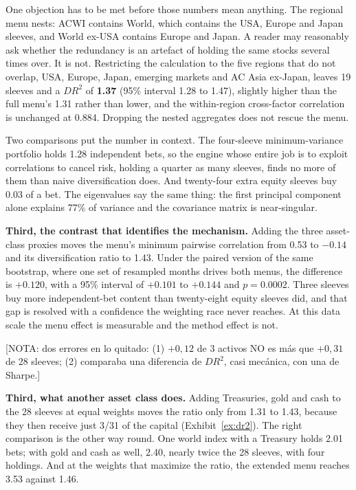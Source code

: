 \documentclass[12pt,letterpaper]{article}
\newcommand{\nota}[1]{{\color{notac}\sffamily\small [NOTA: #1]}}
\newenvironment{quitado}{\par\color{quitarc}}{\par}
\newenvironment{nuevotexto}{\par\color{nuevoc}}{\par}
\newcommand{\head}[1]{\noindent\textbf{#1}\hspace{0.5em}\ignorespaces}
\begin{document}
One objection has to be met before those numbers mean anything. The regional menu nests:
ACWI contains World, which contains the USA, Europe and Japan sleeves, and World ex-USA
contains Europe and Japan. A reader may reasonably ask whether the redundancy is an artefact of
holding the same stocks several times over. It is not. Restricting the calculation to the five
regions that do not overlap, USA, Europe, Japan, emerging markets and AC Asia ex-Japan, leaves
19 sleeves and a $DR^{2}$ of \textbf{1.37} (95\% interval 1.28 to 1.47), slightly higher than
the full menu's 1.31 rather than lower, and the within-region cross-factor correlation is
unchanged at 0.884. Dropping the nested aggregates does not rescue the menu.

Two comparisons put the number in context. The four-sleeve minimum-variance portfolio holds
1.28 independent bets, so the engine whose entire job is to exploit correlations to
cancel risk, holding a quarter as many sleeves, finds no more of them than naive diversification
does. And twenty-four extra equity sleeves buy 0.03 of a bet. The eigenvalues say the same thing: the first principal component alone explains
77\% of variance and the covariance matrix is near-singular.

\begin{quitado}
\head{Third, the contrast that identifies the mechanism.} Adding the three
asset-class proxies moves the menu's minimum pairwise correlation from 0.53 to
$-0.14$ and its diversification ratio to 1.43. Under the paired version of the
same bootstrap, where one set of resampled months drives both menus, the
difference is $+0.120$, with a 95\% interval of $+0.101$ to $+0.144$ and $p = 0.0002$. Three sleeves buy more independent-bet content than twenty-eight
equity sleeves did, and that gap is resolved with a confidence the weighting race
never reaches. At this data scale the menu effect is measurable and the method effect is not.
\end{quitado}
\nota{dos errores en lo quitado: (1) $+0{,}12$ de 3 activos NO es m\'as que $+0{,}31$ de 28 sleeves; (2) comparaba una diferencia de $DR^2$, casi mec\'anica, con una de Sharpe.}
\begin{nuevotexto}
\head{Third, what another asset class does.} Adding Treasuries, gold and cash to the 28 sleeves at
equal weights moves the ratio only from 1.31 to 1.43, because they then receive just 3/31 of the
capital (Exhibit~\ref{ex:dr2}). The right comparison is the other way round. One world index with a
Treasury holds 2.01 bets; with gold and cash as well, 2.40, nearly twice the 28 sleeves, with four
holdings. And at the weights that maximize the ratio, the extended menu reaches 3.53 against 1.46.
\end{nuevotexto}
\end{document}
